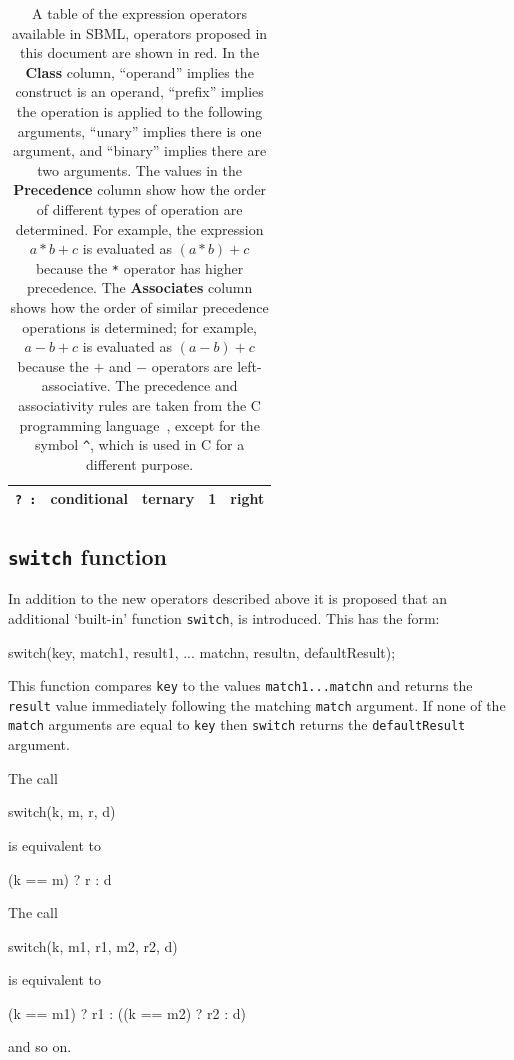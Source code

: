 \documentclass{cekarticle}
\begin{document}
\begin{table}[tbh]
\begin{center}
\begin{tabular}{lllcl}
      \color{red} \verb|? :| & \color{red} conditional & \color{red} ternary & \color{red} 1 & \color{red} right \color{black} \\
      \bottomrule
    \end{tabular}
  \end{center}
  \caption{A table of the expression operators available in SBML,
    operators proposed in this document are shown in red.  In the
    \textbf{\textrm{Class}} column, ``operand'' implies the construct is an
    operand, ``prefix'' implies the operation is applied to the following
    arguments, ``unary'' implies there is one argument, and ``binary''
    implies there are two arguments.  The values in the
    \textbf{\textrm{Precedence}} column show how the order of different
    types of operation are determined.  For example, the expression $a * b
    + c$ is evaluated as $(a * b) + c$ because the \texttt{*} operator has
    higher precedence.  The \textbf{\textrm{Associates}} column shows how
    the order of similar precedence operations is determined; for example,
    $a - b + c$ is evaluated as $(a - b) + c$ because the $+$ and $-$
    operators are left-associative.  The precedence and associativity rules
    are taken from the C programming language~\protect\citep{harbison:1995},
    except for the symbol \texttt{\^}, which is used in C for a different
    purpose.}
  \label{tab:operators}
\end{table}

\subsection{\texttt{switch} function}

In addition to the new operators described above it is proposed
that an additional `built-in' function \texttt{switch}, is
introduced. This has the form:
\begin{example}
switch(key, match1, result1, ... matchn, resultn, defaultResult);
\end{example}

This function compares \texttt{key} to the values
\texttt{match1...matchn} and returns the \texttt{result} value
immediately following the matching \texttt{match} argument.  If
none of the \texttt{match} arguments are equal to \texttt{key}
then \texttt{switch} returns the \texttt{defaultResult} argument.

The call
\begin{example}
switch(k, m, r, d)
\end{example}
is equivalent to
\begin{example}
(k == m) ? r : d
\end{example}
The call
\begin{example}
switch(k, m1, r1, m2, r2, d)
\end{example}
is equivalent to
\begin{example}
(k == m1) ? r1 : ((k == m2) ? r2 : d)
\end{example}
and so on.
\end{document}
